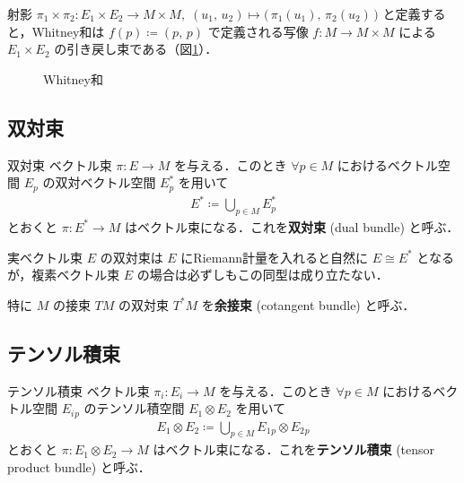 \documentclass[geometry_main]{subfiles}
\begin{document}
射影 $\pi_1 \times \pi_2 \colon E_1 \times E_2 \to M\times M ,\; (u_1,\, u_2) \mapsto \bigl( \,\pi_1(u_1),\, \pi_2(u_2)\, \bigr)$ と定義すると，Whitney和は $f(p) \coloneqq (p,\, p)$ で定義される\cinfty 写像 $f \colon M \to M\times M$ による $E_1 \times E_2$ の引き戻し束である（図\ref{fig.Whitney}）．
\begin{figure}[H]
	\centering
	\caption{Whitney和}
	\label{fig.Whitney}
\end{figure}%

\subsection{双対束}

\begin{mydef}[label=def.dual-bundle]{双対束}
	ベクトル束 $\pi \colon E \to M$ を与える．このとき $\forall p \in M$ におけるベクトル空間 $E_p$ の双対ベクトル空間 $E^*_p$ を用いて
	\begin{align}
		E^* \coloneqq \bigcup_{p\in M} E_p^*
	\end{align}
	とおくと $\pi \colon E^* \to M$ はベクトル束になる．これを\textbf{双対束} (dual bundle) と呼ぶ．
\end{mydef}

\begin{marker}
	実ベクトル束 $E$ の双対束は $E$ にRiemann計量を入れると自然に $E \cong E^*$ となるが，複素ベクトル束 $E$ の場合は必ずしもこの同型は成り立たない．
\end{marker}

特に $M$ の接束 $TM$ の双対束 $T^*M$ を\textbf{余接束} (cotangent bundle) と呼ぶ．

\subsection{テンソル積束}

\begin{mydef}[label=def.tensor-bundle]{テンソル積束}
	ベクトル束 $\pi_i \colon E_i \to M$ を与える．このとき $\forall p \in M$ におけるベクトル空間 $E_i{}_p$ のテンソル積空間 $E_1 \otimes E_2$ を用いて
	\begin{align}
		E_1 \otimes E_2 \coloneqq \bigcup_{p\in M} E_1{}_p \otimes E_2{}_p
	\end{align}
	とおくと $\pi \colon E_1 \otimes E_2 \to M$ はベクトル束になる．これを\textbf{テンソル積束} (tensor product bundle) と呼ぶ．
\end{mydef}
\end{document}
